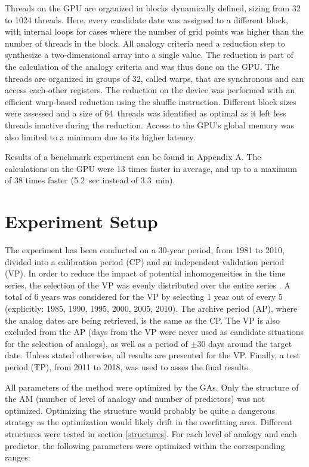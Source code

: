 \documentclass[draft]{agujournal2019}
\begin{document}
Threads on the GPU are organized in blocks dynamically defined, sizing from 32 to 1024 threads. Here, every candidate date was assigned to a different block, with internal loops for cases where the number of grid points was higher than the number of threads in the block. All analogy criteria need a reduction step to synthesize a two-dimensional array into a single value. The reduction is part of the calculation of the analogy criteria and was thus done on the GPU. The threads are organized in groups of 32, called warps, that are synchronous and can access each-other registers. The reduction on the device was performed with an efficient warp-based reduction using the shuffle instruction. Different block sizes were assessed and a size of 64~threads was identified as optimal as it left less threads inactive during the reduction. Access to the GPU's global memory was also limited to a minimum due to its higher latency.

Results of a benchmark experiment can be found in Appendix A. The calculations on the GPU were 13 times faster in average, and up to a maximum of 38 times faster (5.2~sec instead of 3.3~min).


\section{Experiment Setup}
\label{setup}

The experiment has been conducted on a 30-year period, from 1981 to 2010, divided into a calibration period (CP) and an independent validation period (VP). In order to reduce the impact of potential inhomogeneities in the time series, the selection of the VP was evenly distributed over the entire series \cite<as in>[]{BenDaoud2010}. A total of 6 years was considered for the VP by selecting 1 year out of every 5 (explicitly: 1985, 1990, 1995, 2000, 2005, 2010). The archive period (AP), where the analog dates are being retrieved, is the same as the CP. The VP is also excluded from the AP (days from the VP were never used as candidate situations for the selection of analogs), as well as a period of $\pm30$ days around the target date. Unless stated otherwise, all results are presented for the VP. Finally, a test period (TP), from 2011 to 2018, was used to asses the final results. 

All parameters of the method were optimized by the GAs. Only the structure of the AM (number of level of analogy and number of predictors) was not optimized. Optimizing the structure would probably be quite a dangerous strategy as the optimization would likely drift in the overfitting area. Different structures were tested in section \ref{structures}. For each level of analogy and each predictor, the following parameters were optimized within the corresponding ranges:
\end{document}
